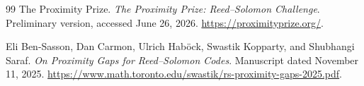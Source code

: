 \documentclass[11pt]{article}
\begin{document}
\begin{thebibliography}{99}
The Proximity Prize.  \emph{The Proximity Prize: Reed--Solomon Challenge}.
Preliminary version, accessed June 26, 2026.
\url{https://proximityprize.org/}.

Eli Ben-Sasson, Dan Carmon, Ulrich Hab\"ock, Swastik Kopparty, and Shubhangi
Saraf.  \emph{On Proximity Gaps for Reed--Solomon Codes}.  Manuscript dated
November 11, 2025.
\url{https://www.math.toronto.edu/swastik/rs-proximity-gaps-2025.pdf}.
\end{thebibliography}
\end{document}
